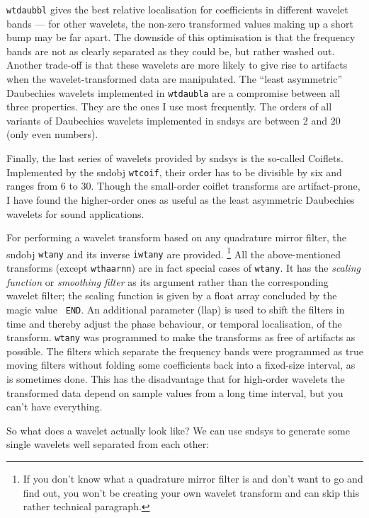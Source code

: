 \documentclass{article}
\def\s{{\sc sndsys} }
\begin{document}
{\tt wtdaubbl} gives the best relative localisation for coefficients in
different wavelet bands --- for other wavelets, the non-zero transformed values
making up a short bump may be far apart.  The downside of this optimisation is
that the frequency bands are not as clearly separated as they could be, but
rather washed out.  Another trade-off is that these wavelets are more likely to
give rise to artifacts when the wavelet-transformed data are manipulated.  The
``least asymmetric'' Daubechies wavelets implemented in {\tt wtdaubla} are a
compromise between all three properties.  They are the ones I use most
frequently.  The orders of all variants of Daubechies wavelets implemented in
\s are between 2 and 20 (only even numbers).

Finally, the last series of wavelets provided  by \s is the so-called Coiflets.
Implemented by the sndobj {\tt wtcoif}, their order has to be divisible by six
and ranges from 6 to 30.  Though the small-order coiflet transforms are
artifact-prone, I have found the higher-order ones as useful as the least
asymmetric Daubechies wavelets for sound applications.

For performing a wavelet transform based on any quadrature mirror filter, the
sndobj {\tt wtany} and its inverse {\tt iwtany} are provided.%
%
\footnote{If you don't know what a quadrature mirror filter is and don't want
to go and find out, you won't be creating your own wavelet transform and can
skip this rather technical paragraph.}
%
All the above-mentioned transforms (except {\tt wthaarnn}) are in fact special
cases of {\tt wtany}.  It has the {\it scaling function} or {\it smoothing
filter} as its argument rather than the corresponding wavelet filter; the
scaling function is given by a float array concluded by the magic value {\tt
END}.  An additional parameter (llap) is used to shift the filters in time
and thereby adjust the phase behaviour, or temporal localisation, of the
transform.  {\tt wtany} was programmed to make the transforms as free of
artifacts as possible.  The filters which separate the frequency bands were
programmed as true moving filters without folding some coefficients back into a
fixed-size interval, as is sometimes done.  This has the disadvantage that for
high-order wavelets the transformed data depend on sample values from a long
time interval, but you can't have everything.

So what does a wavelet actually look like?  We can use \s to generate some
single wavelets well separated from each other:
\end{document}
